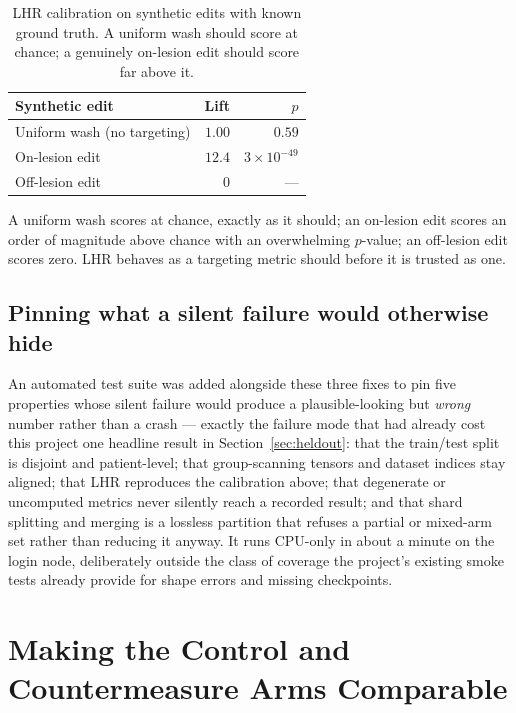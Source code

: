 \begin{table}[h]
\centering
\caption[LHR calibration]{LHR calibration on synthetic edits with known
ground truth. A uniform wash should score at chance; a genuinely on-lesion
edit should score far above it.}
\label{tab:lhr_cal}
\begin{tabular}{@{}lrr@{}}
\toprule
\textbf{Synthetic edit} & \textbf{Lift} & \textbf{$p$} \\
\midrule
Uniform wash (no targeting)  & $1.00$  & $0.59$ \\
On-lesion edit               & $12.4$  & $3\times10^{-49}$ \\
Off-lesion edit              & $0$     & --- \\
\bottomrule
\end{tabular}
\end{table}

A uniform wash scores at chance, exactly as it should; an on-lesion edit
scores an order of magnitude above chance with an overwhelming $p$-value;
an off-lesion edit scores zero. LHR behaves as a targeting metric should
before it is trusted as one.

\subsection{Pinning what a silent failure would otherwise hide}

An automated test suite was added alongside these three fixes to pin five
properties whose silent failure would produce a plausible-looking but
\emph{wrong} number rather than a crash --- exactly the failure mode that
had already cost this project one headline result in
Section~\ref{sec:heldout}: that the train/test split is disjoint and
patient-level; that group-scanning tensors and dataset indices stay
aligned; that LHR reproduces the calibration above; that degenerate or
uncomputed metrics never silently reach a recorded result; and that shard
splitting and merging is a lossless partition that refuses a partial or
mixed-arm set rather than reducing it anyway. It runs CPU-only in about a
minute on the login node, deliberately outside the class of coverage the
project's existing smoke tests already provide for shape errors and
missing checkpoints.

\section{Making the Control and Countermeasure Arms Comparable}
\label{sec:arms}

